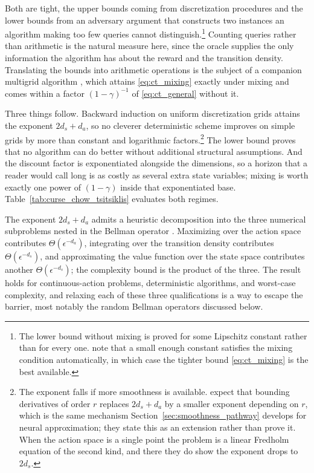 Both are tight, the upper bounds coming from discretization procedures and the lower bounds from an adversary argument that constructs two instances an algorithm making too few queries cannot distinguish.\footnote{The lower bound without mixing is proved for some Lipschitz constant rather than for every one. \citeauthor{chow1989complexity} note that a small enough constant satisfies the mixing condition automatically, in which case the tighter bound \eqref{eq:ct_mixing} is the best available.} Counting queries rather than arithmetic is the natural measure here, since the oracle supplies the only information the algorithm has about the reward and the transition density. Translating the bounds into arithmetic operations is the subject of a companion multigrid algorithm \citep{chow1989multigrid}, which attains \eqref{eq:ct_mixing} exactly under mixing and comes within a factor $(1-\gamma)^{-1}$ of \eqref{eq:ct_general} without it.

Three things follow. Backward induction on uniform discretization grids attains the exponent $2d_s + d_a$, so no cleverer deterministic scheme improves on simple grids by more than constant and logarithmic factors.\footnote{The exponent falls if more smoothness is available. \citeauthor{chow1989complexity} expect that bounding derivatives of order $r$ replaces $2d_s + d_a$ by a smaller exponent depending on $r$, which is the same mechanism Section~\ref{sec:smoothness_pathway} develops for neural approximation; they state this as an extension rather than prove it. When the action space is a single point the problem is a linear Fredholm equation of the second kind, and there they do show the exponent drops to $2d_s$.} The lower bound proves that no algorithm can do better without additional structural assumptions. And the discount factor is exponentiated alongside the dimensions, so a horizon that a reader would call long is as costly as several extra state variables; mixing is worth exactly one power of $(1-\gamma)$ inside that exponentiated base. Table~\ref{tab:curse_chow_tsitsiklis} evaluates both regimes.



The exponent $2d_s + d_a$ admits a heuristic decomposition into the three numerical subproblems nested in the Bellman operator \citep{rust1996numerical}. Maximizing over the action space contributes $\Theta(\epsilon^{-d_a})$, integrating over the transition density contributes $\Theta(\epsilon^{-d_s})$, and approximating the value function over the state space contributes another $\Theta(\epsilon^{-d_s})$; the complexity bound is the product of the three. The result holds for continuous-action problems, deterministic algorithms, and worst-case complexity, and relaxing each of these three qualifications is a way to escape the barrier, most notably the random Bellman operators discussed below.

